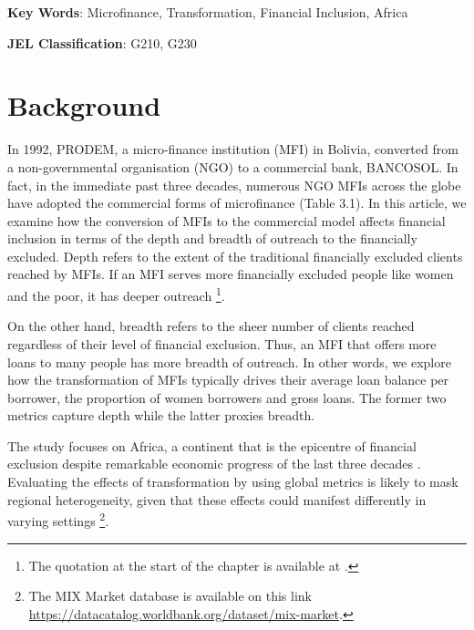 \documentclass[a4paper, nobind]{templates/ociamthesis}
\begin{document}
\vspace{10mm}

\textbf{Key Words}: Microfinance, Transformation, Financial Inclusion, Africa

\vspace{5mm}

\textbf{JEL Classification}: G210, G230

\newpage

\newpage

\hypertarget{background-1}{%
\section{Background}\label{background-1}}

In 1992, PRODEM, a micro-finance institution (MFI) in Bolivia, converted from a non-governmental organisation (NGO) to a commercial bank, BANCOSOL. In fact, in the immediate past three decades, numerous NGO MFIs across the globe have adopted the commercial forms of microfinance (Table 3.1). In this article, we examine how the conversion of MFIs to the commercial model affects financial inclusion in terms of the depth and breadth of outreach to the financially excluded. Depth refers to the extent of the traditional financially excluded clients reached by MFIs. If an MFI serves more financially excluded people like women and the poor, it has deeper outreach \footnote{The quotation at the start of the chapter is available at \textcite{financialtimesinclusion}.}.

On the other hand, breadth refers to the sheer number of clients reached regardless of their level of financial exclusion. Thus, an MFI that offers more loans to many people has more breadth of outreach. In other words, we explore how the transformation of MFIs typically drives their average loan balance per borrower, the proportion of women borrowers and gross loans. The former two metrics capture depth while the latter proxies breadth.

The study focuses on Africa, a continent that is the epicentre of financial exclusion despite remarkable economic progress of the last three decades \autocite{beck2014sme,allen2011african}. Evaluating the effects of transformation by using global metrics is likely to mask regional heterogeneity, given that these effects could manifest differently in varying settings \autocite{d2017ngos,d2013unsubsidized} \footnote{The MIX Market database is available on this link \url{https://datacatalog.worldbank.org/dataset/mix-market}.}.
\end{document}
